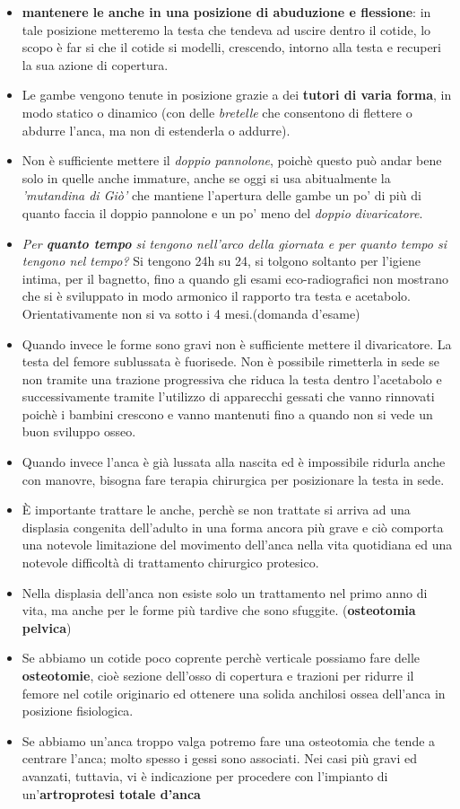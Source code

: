 \begin{itemize}
\item
  \textbf{mantenere le anche in una posizione di abuduzione e flessione}: in tale posizione metteremo la testa che tendeva ad uscire dentro il cotide, lo scopo è far si che il cotide si modelli, crescendo, intorno alla testa e recuperi la sua azione di copertura.
\item
  Le gambe vengono tenute in posizione grazie a dei \textbf{tutori di varia forma}, in modo statico o dinamico (con delle \emph{bretelle} che consentono di flettere o abdurre l'anca, ma non di estenderla o addurre).
\item
  Non è sufficiente mettere il \emph{doppio pannolone}, poichè questo può andar bene solo in quelle anche immature, anche se oggi si usa abitualmente la \emph{'mutandina di Giò'} che mantiene l'apertura delle gambe un po' di più di quanto faccia il doppio pannolone e un po' meno del \emph{doppio divaricatore}.
\item
  \emph{Per \textbf{quanto tempo} si tengono nell'arco della giornata e per quanto tempo si tengono nel tempo?} Si tengono 24h su 24, si tolgono soltanto per l'igiene intima, per il bagnetto, fino a quando gli esami eco-radiografici non mostrano che si è sviluppato in modo armonico il rapporto tra testa e acetabolo. Orientativamente non si va sotto i 4 mesi.(domanda d'esame)
\item
  Quando invece le forme sono gravi non è sufficiente mettere il divaricatore. La testa del femore sublussata è fuorisede. Non è possibile rimetterla in sede se non tramite una trazione progressiva che riduca la testa dentro l'acetabolo e successivamente tramite l'utilizzo di apparecchi gessati che vanno rinnovati poichè i bambini crescono e vanno mantenuti fino a quando non si vede un buon sviluppo osseo.
\item
  Quando invece l'anca è già lussata alla nascita ed è impossibile ridurla anche con manovre, bisogna fare terapia chirurgica per posizionare la testa in sede.
\item
  È importante trattare le anche, perchè se non trattate si arriva ad una displasia congenita dell'adulto in una forma ancora più grave e ciò comporta una notevole limitazione del movimento dell'anca nella vita quotidiana ed una notevole difficoltà di trattamento chirurgico protesico.
\item
  Nella displasia dell'anca non esiste solo un trattamento nel primo anno di vita, ma anche per le forme più tardive che sono sfuggite. (\textbf{osteotomia pelvica})
\item
  Se abbiamo un cotide poco coprente perchè verticale possiamo fare delle \textbf{osteotomie}, cioè sezione dell'osso di copertura e trazioni per ridurre il femore nel cotile originario ed ottenere una solida anchilosi ossea dell'anca in posizione fisiologica.
\item
  Se abbiamo un'anca troppo valga potremo fare una osteotomia che tende a centrare l'anca; molto spesso i gessi sono associati. Nei casi più gravi ed avanzati, tuttavia, vi è indicazione per procedere con l'impianto di un'\textbf{artroprotesi totale d'anca}
\end{itemize}

